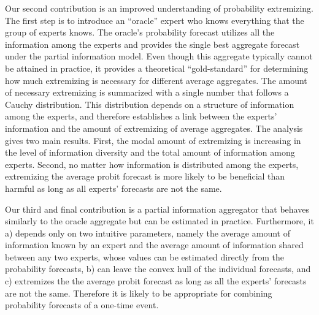 \documentclass[11pt]{article}
\theoremstyle{definition}
\theoremstyle{definition}
\begin{document}
Our second contribution is an improved understanding of probability extremizing. The first step is to introduce an ``oracle'' expert who knows everything that the group of experts knows. The oracle's probability forecast  utilizes all the information among the experts and provides the single best aggregate forecast under the partial information model. Even though this aggregate typically cannot be attained in practice, it provides a theoretical ``gold-standard'' for determining how much extremizing is necessary for different average aggregates. The amount of necessary extremizing is summarized with a single number that follows a Cauchy distribution. This distribution depends on a structure of information among the experts, and therefore 
establishes a link between the experts' information and the amount of extremizing of average aggregates. The analysis gives two main results. First, the modal amount of extremizing is increasing in the level of information diversity and the total amount of information among experts. Second, no matter how information is distributed among the experts, extremizing the average probit forecast is more likely to be beneficial than harmful as long as all experts' forecasts are not the same. 



Our third and final contribution is a partial information aggregator that behaves similarly to the oracle aggregate but can be estimated in practice. Furthermore, it a) depends only on two intuitive parameters, namely the average amount of information known by an expert and the average amount of information shared between any two experts, whose values can be estimated directly from the probability forecasts, b) can leave the convex hull of the individual forecasts, and c) extremizes the the average probit forecast as long as all the experts' forecasts are not the same.  Therefore it is likely to be appropriate for combining probability forecasts of a one-time event.


\end{document}
